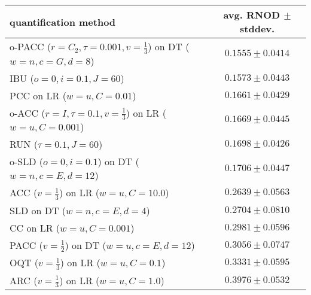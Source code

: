 \begin{tabular}{lc}
  \toprule
  quantification method & avg. RNOD $\pm$ stddev. \\
  \midrule
  o-PACC ($r=C_2, \tau=0.001, v=\frac{1}{3}$) on DT ($w=n, c=G, d=8$) & $\mathbf{0.1555 \pm 0.0414}$ \\
  IBU ($o=0, i=0.1, J=60$) & $0.1573 \pm 0.0443$ \\
  PCC on LR ($w=u, C=0.01$) & $0.1661 \pm 0.0429$ \\
  o-ACC ($r=I, \tau=0.1, v=\frac{1}{3}$) on LR ($w=u, C=0.001$) & $0.1669 \pm 0.0445$ \\
  RUN ($\tau=0.1, J=60$) & $0.1698 \pm 0.0426$ \\
  o-SLD ($o=0, i=0.1$) on DT ($w=n, c=E, d=12$) & $0.1706 \pm 0.0447$ \\
  ACC ($v=\frac{1}{3}$) on LR ($w=u, C=10.0$) & $0.2639 \pm 0.0563$ \\
  SLD on DT ($w=n, c=E, d=4$) & $0.2704 \pm 0.0810$ \\
  CC on LR ($w=u, C=0.001$) & $0.2981 \pm 0.0596$ \\
  PACC ($v=\frac{1}{2}$) on DT ($w=u, c=E, d=12$) & $0.3056 \pm 0.0747$ \\
  OQT ($v=\frac{1}{3}$) on LR ($w=u, C=0.1$) & $0.3331 \pm 0.0595$ \\
  ARC ($v=\frac{1}{3}$) on LR ($w=u, C=1.0$) & $0.3976 \pm 0.0532$ \\
  \bottomrule
\end{tabular}
